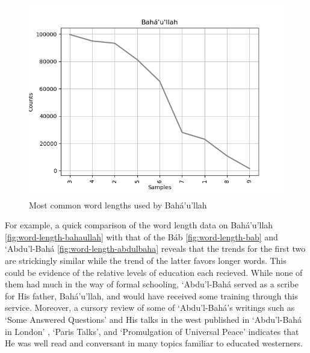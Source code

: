 \documentclass[12pt, oneside]{report}
\begin{document}
\begin{figure}[htb]
	\centering
	\includegraphics[width=15cm]{figures/word-length-bahaullah.png}
	\caption[Most common word lengths used by Bah\'{a}'u'llah]{Most common word lengths used by Bah\'{a}'u'llah}
	\label{fig:word-length-bahaullah}
\end{figure}
For example, a quick comparison of the word length data on Bah\'{a}'u'llah \autoref{fig:word-length-bahaullah} with that of the B\'{a}b \autoref{fig:word-length-bab} and `Abdu'l-Bah\'{a} \autoref{fig:word-length-abdulbaha} reveals that the trends for the first two are strickingly similar while the trend of the latter favors longer words. This could be evidence of the relative levels of education each recieved. While none of them had much in the way of formal schooling, `Abdu'l-Bah\'{a} served as a scribe for His father, Bah\'{a}'u'llah, and would have received some training through this service. Moreover, a cursory review of some of `Abdu'l-Bah\'{a}'s writings such as `Some Answered Questions' and His talks in the west published in `Abdu'l-Bah\'{a} in London' \cite{}, `Paris Talks'\cite{}, and `Promulgation of Universal Peace' \cite{} indicates that He was well read and conversant in many topics familiar to educated westerners.
\end{document}

